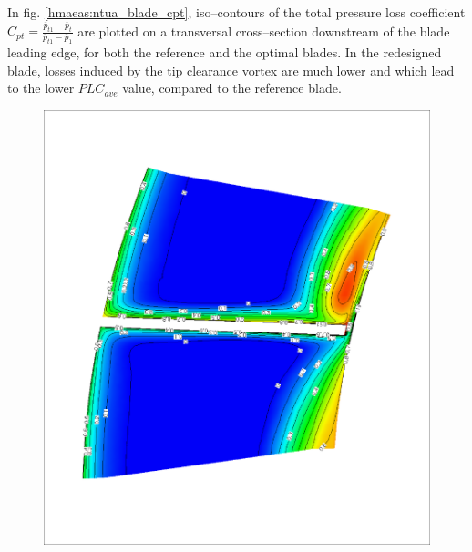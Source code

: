 \documentclass{vki_ls}
\begin{document}
In fig. \ref{hmaeas:ntua_blade_cpt}, iso--contours of the total pressure loss coefficient $C_{pt}=\frac{\overline{p}_{t1}-\overline{p}_t}{\overline{p}_{t1}-\overline{p}_1}$ are plotted on a transversal cross--section downstream of the blade leading edge, for both the reference and the optimal blades. 
In the redesigned blade, losses induced by the tip clearance vortex are much lower and which lead to the lower $PLC_{ave}$ value, compared to the reference blade.
%
\begin{figure}[h!]
\centering
    \begin{minipage}{.49\linewidth}
       \includegraphics[angle=270,scale=0.3]{hmaeas/r_b_img.eps}
    \end{minipage}
    \begin{minipage}{.49\linewidth}

\end{minipage}
\end{figure}
\end{document}
